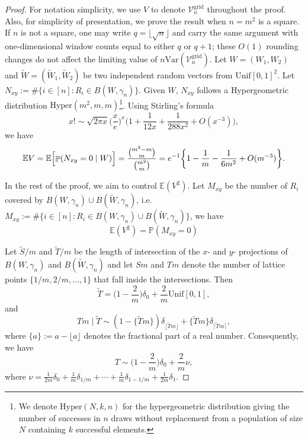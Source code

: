 \documentclass[11pt]{article}
\DeclareMathOperator{\Prob}{\mathbb{P}}
\newcommand{\E}{\mathbb{E}}
\begin{document}
\begin{proof}
For notation simplicity, we use $V$ to denote $\mathcal{V}_n^{\mathrm{grid}}$ throughout the proof. Also, for simplicity of presentation, we prove the result when $n=m^2$ is a square. If $n$ is not a square, one may write $q=\lfloor\sqrt n\rfloor$ and carry the same argument with one-dimensional window counts equal to either $q$ or $q+1$; these $O(1)$ rounding changes do not affect the limiting value of $n\mathrm{Var}(\mathcal{V}_n^{\mathrm{grid}})$.  Let $W = (W_1, W_2)$ and $\widetilde W = (\widetilde W_1, \widetilde W_2)$ be two independent random vectors from $\mathrm{Unif}[0,1]^2$. Let $N_{xy}:= \#\{i\in [n]: R_i \in B(W, \gamma_n)\}$. Given $W$, $N_{xy}$ follows a Hypergeometric distribution $\mathrm{Hyper}(m^2, m, m)$\footnote{We denote $\mathrm{Hyper}(N,k,n)$ for the hypergeometric distribution giving the number of successes in $n$ draws without replacement from a population of size $N$ containing $k$ successful elements.}. Using Stirling's formula
\[  
x! \sim \sqrt{2\pi x}\biggl(\frac{x}{e}\biggr)^x\biggl(1+\frac{1}{12x}+\frac{1}{288x^2}+ O(x^{-3})\biggr),
\]
we have 
\begin{align}
    \E V = \E \Bigl[\Prob(N_{xy} = 0 \mid W)\Bigr] = \frac{{m^2 - m \choose m}}{{m^2 \choose m}} =e^{-1}\biggl\{1-\frac{1}{m}-\frac{1}{6m^2}+O(m^{-3})\biggr\}. \label{eq:EV}
\end{align}

In the rest of the proof, we aim to control $\mathbb{E}(V^2)$. Let $M_{xy}$ be the number of $R_i$ covered by $B(W, \gamma_n)\cup B(\widetilde W, \gamma_n)$, i.e. $M_{xy}:= \#\{i \in [n]: R_i \in B(W, \gamma_n) \cup B(\widetilde W, \gamma_n)\}$, we have 
\[
  \mathbb{E}(V^2) = \mathbb{P}(M_{xy} = 0)
\]

Let $\widetilde S / m$ and $\widetilde T / m$ be the length of intersection of the $x$- and $y$- projections of $B(W,\gamma_n)$ and $B(\widetilde W,\gamma_n)$ and let $Sm$ and $Tm$ denote the number of lattice points $\{1/m, 2/m, \ldots,1\}$ that fall inside the intersections. Then 
\[
  \widetilde T = \biggl(1-\frac{2}{m}\biggr)\delta_0 + \frac{2}{m}\mathrm{Unif}[0, 1],
\]
and 
\[
  Tm\mid \widetilde{T} \sim (1-\{\widetilde T m\}) \delta_{\lfloor \widetilde T m\rfloor } + \{\widetilde T m\}\delta_{\lceil \widetilde T m\rceil},
\]
where $\{a\} := a-\lfloor a\rfloor$ denotes the fractional part of a real number. Consequently, we have 
\[
  T \sim \biggl(1-\frac{2}{m}\biggr)\delta_0 + \frac{2}{m}\nu,
\]
where $\nu = \frac{1}{2m}\delta_0 + \frac{1}{m}\delta_{1/m} + \cdots + \frac{1}{m}\delta_{1-1/m}+\frac{1}{2m}\delta_{1}$. 


\end{proof}
\end{document}
